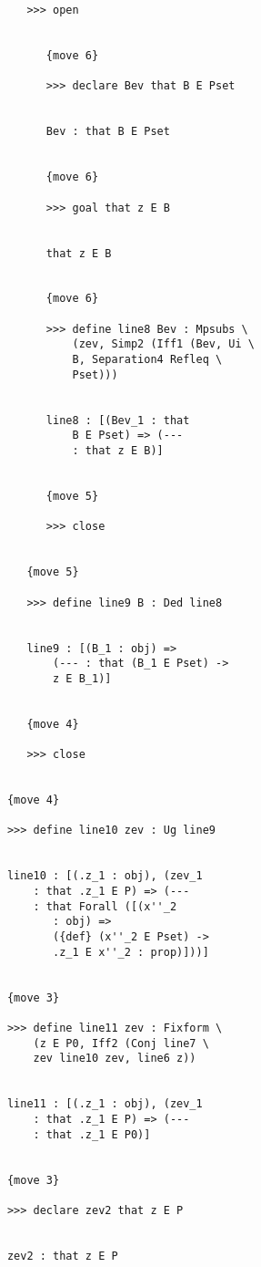 \documentclass[12pt]{article}
\begin{document}
\begin{verbatim}
               >>> open


                  {move 6}

                  >>> declare Bev that B E Pset


                  Bev : that B E Pset


                  {move 6}

                  >>> goal that z E B


                  that z E B


                  {move 6}

                  >>> define line8 Bev : Mpsubs \
                      (zev, Simp2 (Iff1 (Bev, Ui \
                      B, Separation4 Refleq \
                      Pset)))


                  line8 : [(Bev_1 : that 
                      B E Pset) => (--- 
                      : that z E B)]


                  {move 5}

                  >>> close


               {move 5}

               >>> define line9 B : Ded line8


               line9 : [(B_1 : obj) => 
                   (--- : that (B_1 E Pset) -> 
                   z E B_1)]


               {move 4}

               >>> close


            {move 4}

            >>> define line10 zev : Ug line9


            line10 : [(.z_1 : obj), (zev_1 
                : that .z_1 E P) => (--- 
                : that Forall ([(x''_2 
                   : obj) => 
                   ({def} (x''_2 E Pset) -> 
                   .z_1 E x''_2 : prop)]))]


            {move 3}

            >>> define line11 zev : Fixform \
                (z E P0, Iff2 (Conj line7 \
                zev line10 zev, line6 z))


            line11 : [(.z_1 : obj), (zev_1 
                : that .z_1 E P) => (--- 
                : that .z_1 E P0)]


            {move 3}

            >>> declare zev2 that z E P


            zev2 : that z E P



\end{verbatim}
\end{document}
